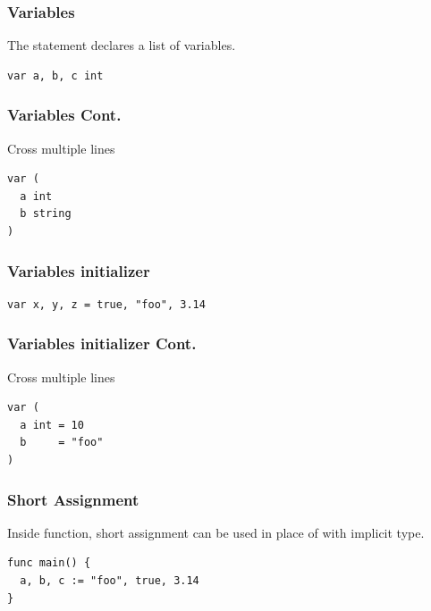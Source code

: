 \documentclass[xetex,mathserif,serif,12pt]{beamer}
\begin{document}
\begin{frame}[fragile]
  \frametitle{Variables}

  The  statement declares a list of variables.
  \newline

  \begin{beamer@nomargin}
    \begin{lstlisting}
var a, b, c int
    \end{lstlisting}
  \end{beamer@nomargin}
\end{frame}

\begin{frame}[fragile]
  \frametitle{Variables Cont.}

  Cross multiple lines
  \newline

  \begin{beamer@nomargin}
    \begin{lstlisting}
var (
  a int
  b string
)
    \end{lstlisting}
  \end{beamer@nomargin}
\end{frame}

\begin{frame}[fragile]
  \frametitle{Variables initializer}

  \begin{beamer@nomargin}
    \begin{lstlisting}
var x, y, z = true, "foo", 3.14
    \end{lstlisting}
  \end{beamer@nomargin}
\end{frame}

\begin{frame}[fragile]
  \frametitle{Variables initializer Cont.}

  Cross multiple lines
  \newline

  \begin{beamer@nomargin}
    \begin{lstlisting}
var (
  a int = 10
  b     = "foo"
)
    \end{lstlisting}
  \end{beamer@nomargin}
\end{frame}

\begin{frame}[fragile]
  \frametitle{Short Assignment}

  \alert{Inside function}, \hltexttt{:=} short assignment can
  be used in place of  with implicit type.
  \newline

  \begin{beamer@nomargin}
    \begin{lstlisting}
func main() {
  a, b, c := "foo", true, 3.14
}
    \end{lstlisting}
  \end{beamer@nomargin}
\end{frame}
\end{document}

